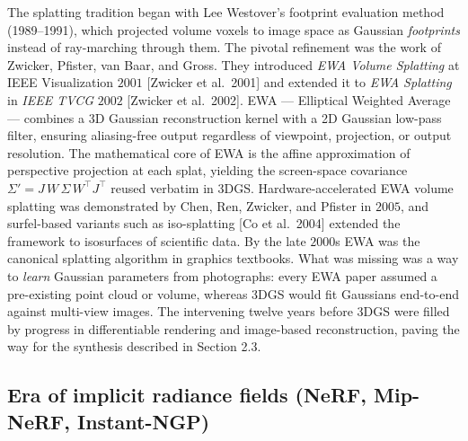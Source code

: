 The splatting tradition began with Lee Westover's footprint evaluation method (1989--1991), which projected volume voxels to image space as Gaussian \emph{footprints} instead of ray-marching through them. The pivotal refinement was the work of Zwicker, Pfister, van Baar, and Gross. They introduced \emph{EWA Volume Splatting} at IEEE Visualization \(2001\) {[}Zwicker et al.~2001{]} and extended it to \emph{EWA Splatting} in \emph{IEEE TVCG} \(2002\) {[}Zwicker et al.~2002{]}. EWA --- Elliptical Weighted Average --- combines a 3D Gaussian reconstruction kernel with a 2D Gaussian low-pass filter, ensuring aliasing-free output regardless of viewpoint, projection, or output resolution. The mathematical core of EWA is the affine approximation of perspective projection at each splat, yielding the screen-space covariance \(\Sigma'=J\,W\,\Sigma\,W^{\top}J^{\top}\) reused verbatim in 3DGS. Hardware-accelerated EWA volume splatting was demonstrated by Chen, Ren, Zwicker, and Pfister in \(2005\), and surfel-based variants such as iso-splatting {[}Co et al.~2004{]} extended the framework to isosurfaces of scientific data. By the late \(2000\)s EWA was the canonical splatting algorithm in graphics textbooks. What was missing was a way to \emph{learn} Gaussian parameters from photographs: every EWA paper assumed a pre-existing point cloud or volume, whereas 3DGS would fit Gaussians end-to-end against multi-view images. The intervening twelve years before 3DGS were filled by progress in differentiable rendering and image-based reconstruction, paving the way for the synthesis described in Section 2.3.

\subsection{Era of implicit radiance fields (NeRF, Mip-NeRF, Instant-NGP)}\label{era-of-implicit-radiance-fields-nerf-mip-nerf-instant-ngp}

